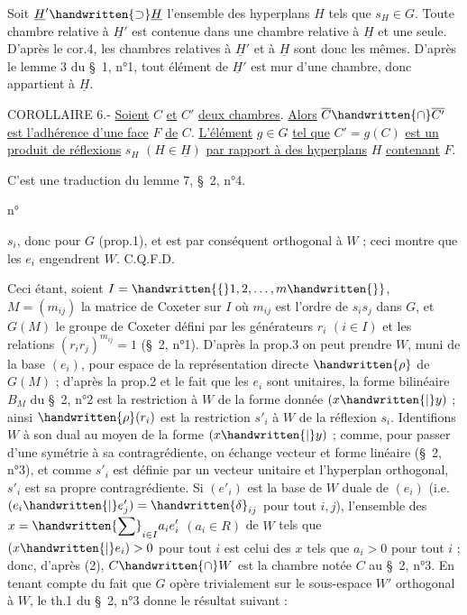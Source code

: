 Soit $\underline{H}'\handwritten{\supset}\underline{H}$ l'ensemble des hyperplans $H$ tels que $s_H\in G$. Toute chambre relative à $\underline{H}'$ est contenue dans une chambre relative à $\underline{H}$ et une seule. D'après le cor.4, les chambres relatives à $\underline{H}'$ et à $\underline{H}$ sont donc les mêmes. D'après le lemme 3 du \S\ 1, n°1, tout élément de $\underline{H}'$ est mur d'une chambre, donc appartient à $\underline{H}$.

COROLLAIRE 6.- \uline{Soient} $C$ \uline{et} $C'$ \uline{deux chambres}. \uline{Alors} $\overline{C}\handwritten{\cap}\overline{C'}$ \uline{est l'adhérence d'une face} $F$ \uline{de} $C$. \uline{L'élément} $g\in G$ \uline{tel que} $C'=g(C)$ \uline{est un produit de réflexions} $s_H$ $(H\in\underline{H})$ \uline{par rapport à des hyperplans} $H$ \uline{contenant} $F$.

C'est une traduction du lemme 7, \S\ 2, n°4.

\begin{flushright}n° \end{flushright}
$s_i$, donc pour $G$ (prop.1), et est par conséquent orthogonal à $W$ ; ceci montre que les $e_i$ engendrent $W$. C.Q.F.D.

Ceci étant, soient $I=\handwritten{\{}1,2,\ldots,m\handwritten{\}}$, $M=(m_{ij})$ la matrice de Coxeter sur $I$ où $m_{ij}$ est l'ordre de $s_i s_j$ dans $G$, et $G(M)$ le groupe de Coxeter défini par les générateurs $r_i$ $(i\in I)$ et les relations $(r_i r_j)^{m_{ij}}=1$ (\S\ 2, n°1). D'après la prop.3 on peut prendre $W$, muni de la base $(e_i)$, pour espace de la représentation directe $\handwritten{\rho}$ de $G(M)$ ; d'après la prop.2 et le fait que les $e_i$ sont unitaires, la forme bilinéaire $B_M$ du \S\ 2, n°2 est la restriction à $W$ de la forme donnée $(x\handwritten{|}y)$ ; ainsi $\handwritten{\rho}(r_i)$ est la restriction $s'_i$ à $W$ de la réflexion $s_i$. Identifions $W$ à son dual au moyen de la forme $(x\handwritten{|}y)$ ; comme, pour passer d'une symétrie à sa contragrédiente, on échange vecteur et forme linéaire (\S\ 2, n°3), et comme $s'_i$ est définie par un vecteur unitaire et l'hyperplan orthogonal, $s'_i$ est sa propre contragrédiente. Si $(e'_i)$ est la base de $W$ duale de $(e_i)$ (i.e. $(e_i\handwritten{|}e'_j)=\handwritten{\delta}_{ij}$ pour tout $i,j$), l'ensemble des $\displaystyle x=\handwritten{\sum}_{i\in I}a_i e'_i$ $(a_i\in R)$ de $W$ tels que $(x\handwritten{|}e_i)>0$ pour tout $i$ est celui des $x$ tels que $a_i>0$ pour tout $i$ ; donc, d'après (2), $C\handwritten{\cap}W$ est la chambre notée $C$ au \S\ 2, n°3. En tenant compte du fait que $G$ opère trivialement sur le sous-espace $W'$ orthogonal à $W$, le th.1 du \S\ 2, n°3 donne le résultat suivant :

